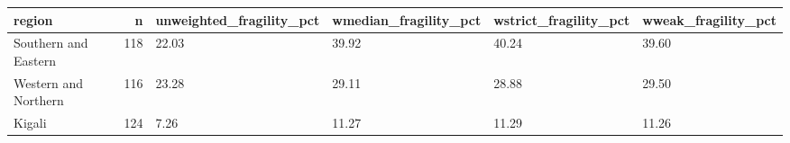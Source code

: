 \begin{tabular}{lrllll}
\toprule
region & n & unweighted\_fragility\_pct & wmedian\_fragility\_pct & wstrict\_fragility\_pct & wweak\_fragility\_pct \\
\midrule
Southern and Eastern & 118 & 22.03 & 39.92 & 40.24 & 39.60 \\
Western and Northern & 116 & 23.28 & 29.11 & 28.88 & 29.50 \\
Kigali & 124 & 7.26 & 11.27 & 11.29 & 11.26 \\
\bottomrule
\end{tabular}
